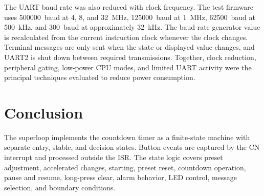 \documentclass[11pt]{article}
\begin{document}
The UART baud rate was also reduced with clock frequency. The test firmware uses 500000~baud at 4, 8, and 32~MHz, 125000~baud at 1~MHz, 62500~baud at 500~kHz, and 300~baud at approximately 32~kHz. The baud-rate generator value is recalculated from the current instruction clock whenever the clock changes. Terminal messages are only sent when the state or displayed value changes, and UART2 is shut down between required transmissions. Together, clock reduction, peripheral gating, low-power CPU modes, and limited UART activity were the principal techniques evaluated to reduce power consumption.

\section{Conclusion}

The superloop implements the countdown timer as a finite-state machine with separate entry, stable, and decision states. Button events are captured by the CN interrupt and processed outside the ISR. The state logic covers preset adjustment, accelerated changes, starting, preset reset, countdown operation, pause and resume, long-press clear, alarm behavior, LED control, message selection, and boundary conditions.
\end{document}
